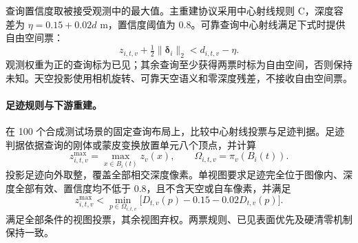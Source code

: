 查询置信度取被接受观测中的最大值。主重建协议采用中心射线规则 C，深度容差为 $\eta=0.15+0.02d$ m，置信度阈值为 0.8。可靠查询中心射线满足下式时提供自由空间票：
\begin{equation}
z_{i,t,v}+\tfrac12\|\boldsymbol\delta_i\|_2<d_{i,t,v}-\eta.
\label{eq:free-space}
\end{equation}
观测权重为正的查询标为已见；其余查询至少获得两票时标为自由空间，否则保持未知。天空投影使用相机旋转、可靠天空语义和零深度残差，不接收自由空间票。

\paragraph{足迹规则与下游重建。}
在 100 个合成测试场景的固定查询布局上，比较中心射线投票与足迹判据。足迹判据依据查询的刚体或蒙皮变换放置单元八个顶点，并计算
\begin{equation}
z^{\max}_{i,t,v}=\max_{x\in B_i(t)}z_v(x),\qquad
\Omega_{i,t,v}=\pi_v(B_i(t)).
\end{equation}
投影足迹向外取整，覆盖全部相交深度像素。单视图要求足迹完全位于图像内、深度全部有效、置信度均不低于 0.8，且不含天空或自车像素，并满足
\begin{equation}
z^{\max}_{i,t,v}<\min_{p\in\Omega_{i,t,v}}
\bigl[D_{t,v}(p)-0.15-0.02D_{t,v}(p)\bigr].
\label{eq:footprint-free}
\end{equation}
满足全部条件的视图投票，其余视图弃权。两票规则、已见表面优先及硬清零机制保持一致。

